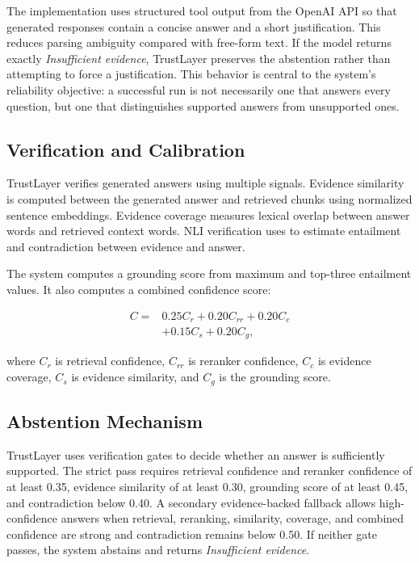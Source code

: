 \documentclass[11pt]{article}
\begin{document}
The implementation uses structured tool output from the OpenAI API so that generated responses contain a concise answer and a short justification. This reduces parsing ambiguity compared with free-form text. If the model returns exactly \emph{Insufficient evidence}, TrustLayer preserves the abstention rather than attempting to force a justification. This behavior is central to the system's reliability objective: a successful run is not necessarily one that answers every question, but one that distinguishes supported answers from unsupported ones.

\subsection{Verification and Calibration}

TrustLayer verifies generated answers using multiple signals. Evidence similarity is computed between the generated answer and retrieved chunks using normalized sentence embeddings. Evidence coverage measures lexical overlap between answer words and retrieved context words. NLI verification uses  to estimate entailment and contradiction between evidence and answer.

The system computes a grounding score from maximum and top-three entailment values. It also computes a combined confidence score:

\begin{equation}
\begin{split}
C = &0.25 C_r + 0.20 C_{rr} + 0.20 C_c \\
    &+ 0.15 C_s + 0.20 C_g ,
\end{split}
\end{equation}

where $C_r$ is retrieval confidence, $C_{rr}$ is reranker confidence, $C_c$ is evidence coverage, $C_s$ is evidence similarity, and $C_g$ is the grounding score.

\subsection{Abstention Mechanism}

TrustLayer uses verification gates to decide whether an answer is sufficiently supported. The strict pass requires retrieval confidence and reranker confidence of at least 0.35, evidence similarity of at least 0.30, grounding score of at least 0.45, and contradiction below 0.40. A secondary evidence-backed fallback allows high-confidence answers when retrieval, reranking, similarity, coverage, and combined confidence are strong and contradiction remains below 0.50. If neither gate passes, the system abstains and returns \emph{Insufficient evidence}.
\end{document}
